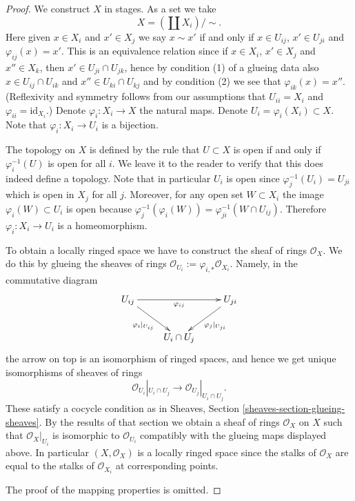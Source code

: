 \begin{proof}
We construct $X$ in stages.
As a set we take
$$
X = (\coprod X_i) / \sim.
$$
Here given $x \in X_i$ and $x' \in X_j$ we say
$x \sim x'$ if and only if $x \in U_{ij}$, $x' \in U_{ji}$
and $\varphi_{ij}(x) = x'$. This is an equivalence relation
since if $x \in X_i$, $x' \in X_j$ and $x'' \in X_k$, then
$x' \in U_{ji} \cap U_{jk}$, hence by condition (1) of 
a glueing data also $x \in U_{ij} \cap U_{ik}$ and
$x'' \in U_{ki} \cap U_{kj}$ and by condition (2)
we see that $\varphi_{ik}(x) = x''$. (Reflexivity and symmetry
follows from our assumptions that $U_{ii} = X_i$ and
$\varphi_{ii} = \text{id}_{X_i}$.)
Denote $\varphi_i : X_i \to X$
the natural maps. Denote $U_i = \varphi_i(X_i) \subset X$.
Note that $\varphi_i : X_i \to U_i$ is a bijection.

\medskip\noindent
The topology on $X$ is defined by the rule that
$U \subset X$ is open if and only if $\varphi_i^{-1}(U)$
is open for all $i$. We leave it to the reader to verify
that this does indeed define a topology.
Note that in particular $U_i$ is open since $\varphi_j^{-1}(U_i)
= U_{ji}$ which is open in $X_j$ for all $j$.
Moreover, for any open set $W \subset X_i$ the image
$\varphi_i(W) \subset U_i$ is open because
$\varphi_j^{-1}(\varphi_i(W)) = \varphi_{ji}^{-1}(W \cap U_{ij})$.
Therefore $\varphi_i : X_i \to U_i$ is a homeomorphism.

\medskip\noindent
To obtain a locally ringed space we have to construct the
sheaf of rings $\mathcal{O}_X$. We do this by glueing the
sheaves of rings $\mathcal{O}_{U_i} := \varphi_{i, *} \mathcal{O}_{X_i}$.
Namely, in the commutative diagram
$$
\xymatrix{
U_{ij} \ar[rr]_{\varphi_{ij}} \ar[rd]_{\varphi_i|_{U_{ij}}}
& & 
U_{ji} \ar[ld]^{\varphi_j|_{U_{ji}}} \\
& U_i \cap U_j &
}
$$
the arrow on top is an isomorphism of ringed spaces,
and hence we get unique isomorphisms of sheaves of rings
$$
\mathcal{O}_{U_i}|_{U_i \cap U_j}
\longrightarrow
\mathcal{O}_{U_j}|_{U_i \cap U_j}.
$$
These satisfy a cocycle condition as in Sheaves,
Section \ref{sheaves-section-glueing-sheaves}.
By the results of that section we obtain a sheaf of rings
$\mathcal{O}_X$ on $X$ such that $\mathcal{O}_X|_{U_i}$
is isomorphic to $\mathcal{O}_{U_i}$ compatibly with
the glueing maps displayed above.
In particular $(X, \mathcal{O}_X)$ is a locally ringed
space since the stalks of $\mathcal{O}_X$ are equal
to the stalks of $\mathcal{O}_{X_i}$ at corresponding
points.

\medskip\noindent
The proof of the mapping properties is omitted.
\end{proof}

